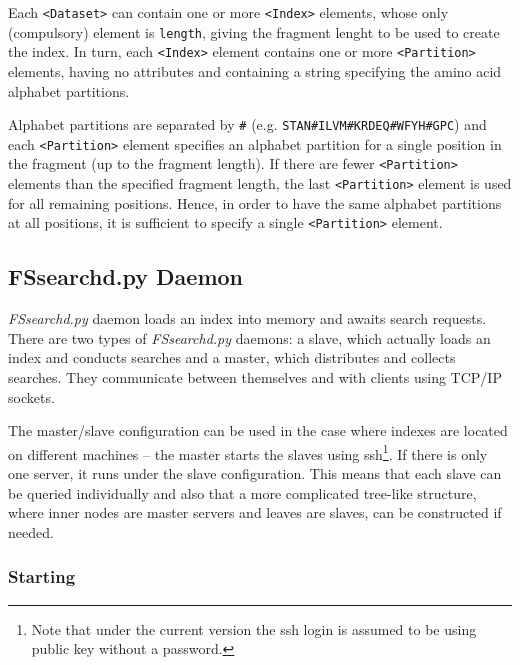 \documentclass[11pt]{article}
\begin{document}
Each \texttt{<Dataset>} can contain one or more \texttt{<Index>} elements, whose only (compulsory) element is \texttt{length}, giving the fragment lenght to be used to create the index. In turn, each \texttt{<Index>} element contains one or more \texttt{<Partition>} elements, having no attributes and containing a string specifying the amino acid alphabet partitions.

Alphabet partitions are separated by \texttt{\#} (e.g. \texttt{STAN\#ILVM\#KRDEQ\#WFYH\#GPC}) and each \texttt{<Partition>} element specifies an alphabet partition for a single position in the fragment (up to the fragment length). If there are fewer \texttt{<Partition>} elements than the specified fragment length, the last \texttt{<Partition>} element is used for all remaining positions. Hence, in order to have the same alphabet partitions at all positions, it is sufficient to specify a single \texttt{<Partition>} element. 

\subsection{FSsearchd.py Daemon}\label{sec:FSdaemon}

\textit{FSsearchd.py} daemon loads an index into memory and awaits search requests. There are two types of \textit{FSsearchd.py} daemons: a slave, which actually loads an index and conducts searches and a master, which distributes and collects searches. They communicate between themselves and with clients using TCP/IP sockets.

The master/slave configuration can be used in the case where indexes are located on different machines -- the master starts the slaves using ssh\footnote{Note that under the current version the ssh login is assumed to be using public key without a password.}. If there is only one server, it runs under the slave configuration. This means that each slave can be queried individually and also that a more complicated tree-like structure, where inner nodes are master servers and leaves are slaves, can be constructed if needed.

\subsubsection{Starting}
\end{document}
